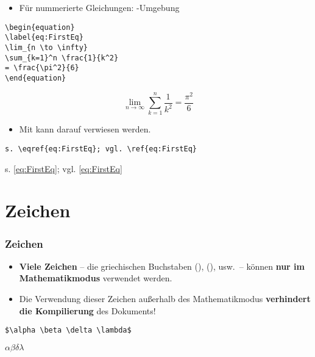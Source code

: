 \begin{frame}[fragile]


\begin{itemize}
	\item Für nummerierte Gleichungen: -Umgebung
\end{itemize}

\begin{lstlisting}
\begin{equation}
\label{eq:FirstEq}
\lim_{n \to \infty}
\sum_{k=1}^n \frac{1}{k^2}
= \frac{\pi^2}{6}
\end{equation}
\end{lstlisting}

\begin{equation}
\label{eq:FirstEq}
	\lim_{n \to \infty}
	\sum_{k=1}^n \frac{1}{k^2}
	= \frac{\pi^2}{6}
\end{equation}

\pause 

\begin{itemize}
	\item Mit  kann darauf verwiesen werden.
\end{itemize}

\begin{lstlisting}
s. \eqref{eq:FirstEq}; vgl. \ref{eq:FirstEq}
\end{lstlisting}

s. \eqref{eq:FirstEq}; vgl. \ref{eq:FirstEq}


\end{frame}


\section{Zeichen}

\begin{frame}[fragile]
\frametitle{Zeichen}

\begin{itemize}
	\item \textbf{Viele Zeichen} -- \zB die griechischen Buchstaben  (\ltxterm{$\alpha$}),  (\ltxterm{$\beta$}), usw.\ -- können \textbf{nur im Mathematikmodus} verwendet werden. 
	
	\item Die Verwendung dieser Zeichen außerhalb des Mathematikmodus \textbf{verhindert die Kompilierung} des Dokuments!

\end{itemize}

\begin{lstlisting}
$\alpha \beta \delta \lambda$
\end{lstlisting}

\ea $\alpha \beta \delta \lambda$
\z 

\end{frame}


